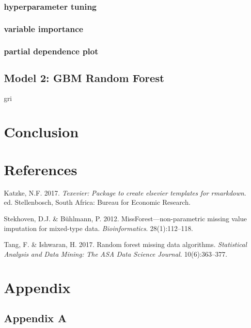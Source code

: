 \documentclass[11pt,preprint, authoryear]{elsarticle}
\numberwithin{equation}{section}
\numberwithin{figure}{section}
\numberwithin{table}{section}
\begin{document}
\hypertarget{hyperparameter-tuning}{%
\subsubsection*{hyperparameter tuning}\label{hyperparameter-tuning}}

\hypertarget{variable-importance}{%
\subsubsection*{variable importance}\label{variable-importance}}

\hypertarget{partial-dependence-plot}{%
\subsubsection*{partial dependence plot}\label{partial-dependence-plot}}

\hypertarget{model-2-gbm-random-forest}{%
\subsection{Model 2: GBM Random
Forest}\label{model-2-gbm-random-forest}}

gri

\hypertarget{conclusion}{%
\section{Conclusion}\label{conclusion}}

\newpage

\hypertarget{references}{%
\section*{References}\label{references}}

\hypertarget{refs}{}
\leavevmode\hypertarget{ref-Texevier}{}%
Katzke, N.F. 2017. \emph{Texevier: Package to create elsevier templates
for rmarkdown}. ed. Stellenbosch, South Africa: Bureau for Economic
Research.

\leavevmode\hypertarget{ref-stekhoven2012missforest}{}%
Stekhoven, D.J. \& Bühlmann, P. 2012. MissForest---non-parametric
missing value imputation for mixed-type data. \emph{Bioinformatics}.
28(1):112--118.

\leavevmode\hypertarget{ref-tang2017random}{}%
Tang, F. \& Ishwaran, H. 2017. Random forest missing data algorithms.
\emph{Statistical Analysis and Data Mining: The ASA Data Science
Journal}. 10(6):363--377.

\hypertarget{appendix}{%
\section*{Appendix}\label{appendix}}

\hypertarget{appendix-a}{%
\subsection*{Appendix A}\label{appendix-a}}


\end{document}
